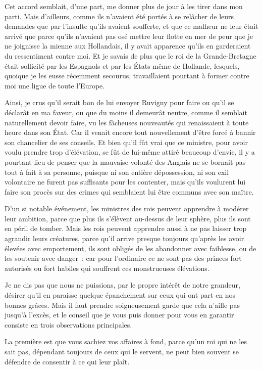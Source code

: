 \documentclass[french,twoside]{book} %
\begin{document}
Cet accord semblait, d’une part, me donner plus de jour à les tirer dans mon parti. Mais d’ailleurs, comme ils n’avaient été portés à se relâcher de leurs demandes que par l’insulte qu’ils avaient soufferte, et que ce malheur ne leur était arrivé que parce qu’ils n’avaient pas osé mettre leur flotte en mer de peur que je ne joignisse la mienne aux Hollandais, il y avait apparence qu’ils en garderaient du ressentiment contre moi. Et je savais de plus que le roi de la Grande-Bretagne était sollicité par les Espagnols et par les États même de Hollande, lesquels, quoique je les eusse récemment secourus, travaillaient pourtant à former contre moi une ligue de toute l’Europe.\par
Ainsi, je crus qu’il serait bon de lui envoyer Ruvigny pour faire ou qu’il se déclarât en ma faveur, ou que du moins il demeurât neutre, comme il semblait naturellement devoir faire, vu les fâcheuses nouveautés qui renaissaient à toute heure dans son État. Car il venait encore tout nouvellement d’être forcé à bannir son chancelier de ses conseils. Et bien qu’il fût vrai que ce ministre, pour avoir voulu prendre trop d’élévation, se fût de lui-même attiré beaucoup d’envie, il y a pourtant lieu de penser que la mauvaise volonté des Anglais ne se bornait pas tout à fait à sa personne, puisque ni son entière dépossession, ni son exil volontaire ne furent pas suffisants pour les contenter, mais qu’ils voulurent lui faire son procès sur des crimes qui semblaient lui être communs avec son maître.\par
D’un si notable événement, les ministres des rois peuvent apprendre à modérer leur ambition, parce que plus ils s’élèvent au-dessus de leur sphère, plus ils sont en péril de tomber. Mais les rois peuvent apprendre aussi à ne pas laisser trop agrandir leurs créatures, parce qu’il arrive presque toujours qu’après les avoir élevées avec emportement, ils sont obligés de les abandonner avec faiblesse, ou de les soutenir avec danger : car pour l’ordinaire ce ne sont pas des princes fort autorisés ou fort habiles qui souffrent ces monstrueuses élévations.\par
Je ne dis pas que nous ne puissions, par le propre intérêt de notre grandeur, désirer qu’il en paraisse quelque épanchement sur ceux qui ont part en nos bonnes grâces. Mais il faut prendre soigneusement garde que cela n’aille pas jusqu’à l’excès, et le conseil que je vous puis donner pour vous en garantir consiste en trois observations principales.\par
La première est que vous sachiez vos affaires à fond, parce qu’un roi qui ne les sait pas, dépendant toujours de ceux qui le servent, ne peut bien souvent se défendre de consentir à ce qui leur plaît.\par
\end{document}
